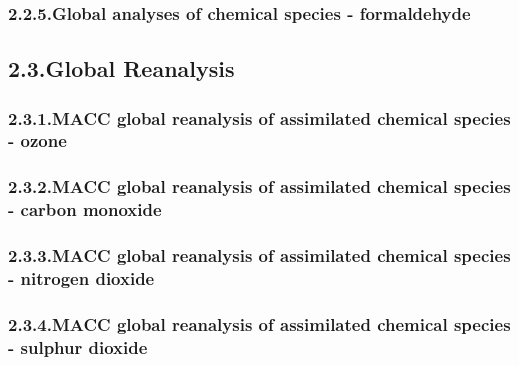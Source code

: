 \documentclass[9pt]{report}
\begin{document}
\subsubsection{2.2.5.\hspace*{0.5em}Global analyses of chemical species - formaldehyde}\label{sec-global-analyses-of-chemical-species---formaldehyde}%

\subsection{2.3.\hspace*{0.5em}Global Reanalysis}\label{sec-global-reanalysis}%

\subsubsection{2.3.1.\hspace*{0.5em}MACC global reanalysis of assimilated chemical species - ozone}\label{sec-macc-global-reanalysis-of-assimilated-chemical-species---ozone}%

\subsubsection{2.3.2.\hspace*{0.5em}MACC global reanalysis of assimilated chemical species - carbon monoxide}\label{sec-macc-global-reanalysis-of-assimilated-chemical-species---carbon-monoxide}%

\subsubsection{2.3.3.\hspace*{0.5em}MACC global reanalysis of assimilated chemical species - nitrogen dioxide}\label{sec-macc-global-reanalysis-of-assimilated-chemical-species---nitrogen-dioxide}%

\subsubsection{2.3.4.\hspace*{0.5em}MACC global reanalysis of assimilated chemical species - sulphur dioxide}\label{sec-macc-global-reanalysis-of-assimilated-chemical-species---sulphur-dioxide}%
\end{document}

